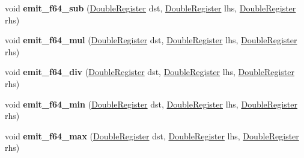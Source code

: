 \begin{DoxyCompactItemize}
\item 
\mbox{\label{classv8_1_1internal_1_1wasm_1_1LiftoffAssembler_a57616a3e3f33608b584d7255c34a10c9}} 
void {\bfseries emit\+\_\+f64\+\_\+sub} (\mbox{\hyperlink{classv8_1_1internal_1_1DoubleRegister}{Double\+Register}} dst, \mbox{\hyperlink{classv8_1_1internal_1_1DoubleRegister}{Double\+Register}} lhs, \mbox{\hyperlink{classv8_1_1internal_1_1DoubleRegister}{Double\+Register}} rhs)
\item 
\mbox{\label{classv8_1_1internal_1_1wasm_1_1LiftoffAssembler_a15e90bc38c7c0ae8f170ecbae345ebe4}} 
void {\bfseries emit\+\_\+f64\+\_\+mul} (\mbox{\hyperlink{classv8_1_1internal_1_1DoubleRegister}{Double\+Register}} dst, \mbox{\hyperlink{classv8_1_1internal_1_1DoubleRegister}{Double\+Register}} lhs, \mbox{\hyperlink{classv8_1_1internal_1_1DoubleRegister}{Double\+Register}} rhs)
\item 
\mbox{\label{classv8_1_1internal_1_1wasm_1_1LiftoffAssembler_a03c79c5659d361bc708f348b519da6c6}} 
void {\bfseries emit\+\_\+f64\+\_\+div} (\mbox{\hyperlink{classv8_1_1internal_1_1DoubleRegister}{Double\+Register}} dst, \mbox{\hyperlink{classv8_1_1internal_1_1DoubleRegister}{Double\+Register}} lhs, \mbox{\hyperlink{classv8_1_1internal_1_1DoubleRegister}{Double\+Register}} rhs)
\item 
\mbox{\label{classv8_1_1internal_1_1wasm_1_1LiftoffAssembler_a44afb568d343f0eaf2baab63d147c071}} 
void {\bfseries emit\+\_\+f64\+\_\+min} (\mbox{\hyperlink{classv8_1_1internal_1_1DoubleRegister}{Double\+Register}} dst, \mbox{\hyperlink{classv8_1_1internal_1_1DoubleRegister}{Double\+Register}} lhs, \mbox{\hyperlink{classv8_1_1internal_1_1DoubleRegister}{Double\+Register}} rhs)
\item 
\mbox{\label{classv8_1_1internal_1_1wasm_1_1LiftoffAssembler_a9521498765d95e3115d90361550da9a1}} 
void {\bfseries emit\+\_\+f64\+\_\+max} (\mbox{\hyperlink{classv8_1_1internal_1_1DoubleRegister}{Double\+Register}} dst, \mbox{\hyperlink{classv8_1_1internal_1_1DoubleRegister}{Double\+Register}} lhs, \mbox{\hyperlink{classv8_1_1internal_1_1DoubleRegister}{Double\+Register}} rhs)

\end{DoxyCompactItemize}
